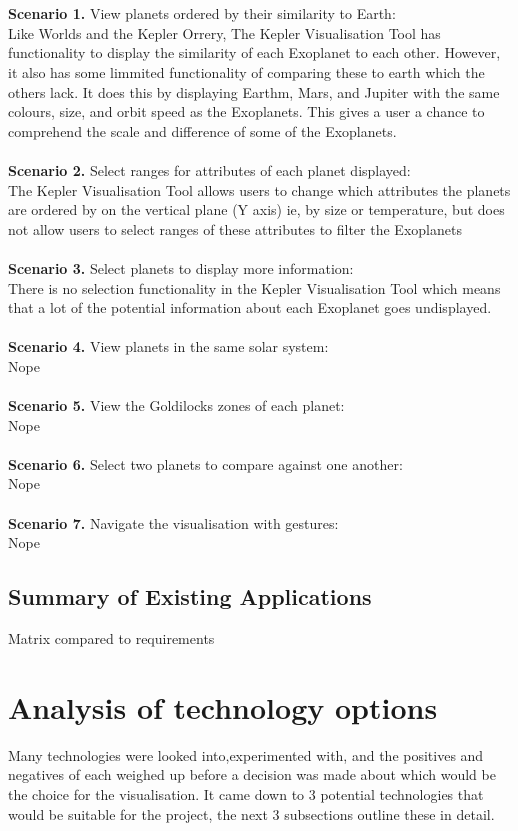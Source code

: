 \\\\
{\bf Scenario 1.} View planets ordered by their similarity to Earth:\\
Like Worlds and the Kepler Orrery, The Kepler Visualisation Tool has functionality to display the similarity of each Exoplanet to each other. However, it also has some limmited functionality of comparing these to earth which the others lack. It does this by displaying Earthm, Mars, and Jupiter with the same colours, size, and orbit speed as the Exoplanets. This gives a user a chance to comprehend the scale and difference of some of the Exoplanets.
\\\\
{\bf Scenario 2.} Select ranges for attributes of each planet displayed:\\
The Kepler Visualisation Tool allows users to change which attributes the planets are ordered by on the vertical plane (Y axis) ie, by size or temperature, but does not allow users to select ranges of these attributes to filter the Exoplanets
\\\\
{\bf Scenario 3.} Select planets to display more information:\\
There is no selection functionality in the Kepler Visualisation Tool which means that a lot of the potential information about each Exoplanet goes undisplayed.
\\\\
{\bf Scenario 4.} View planets in the same solar system:\\
Nope
\\\\
{\bf Scenario 5.} View the Goldilocks zones of each planet:\\
Nope
\\\\
{\bf Scenario 6.} Select two planets to compare against one another:\\
Nope
\\\\
{\bf Scenario 7.} Navigate the visualisation with gestures: \\
Nope

\subsection{Summary of Existing Applications}

Matrix compared to requirements

\section{Analysis of technology options}
Many technologies were looked into,experimented with, and the positives and negatives of each weighed up before a decision was made about which would be the choice for the visualisation. It came down to 3 potential technologies that would be suitable for the project, the next 3 subsections outline these in detail.

